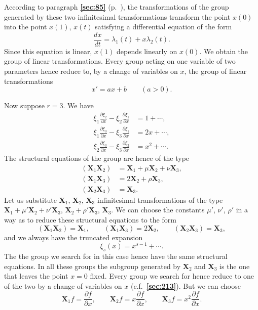 \documentclass[leqno,11pt]{book}
\numberwithin{equation}{chapter}
\newcommand{\pd}{\partial}
\theoremstyle{shape1}
\theoremstyle{shapesmall}
\newcommand{\fsref}[1]{{\rm\textsection\textbf{\ref{sec:#1}}}}
\begin{document}
According to paragraph \fsref{85} (p.~\pageref{sec:85}), the transformations of the group generated by these two infinitesimal transformations transform the point $x(0)$ into the point $x(1)$, $x(t)$ satisfying a differential equation of the form
\[
\frac{dx}{dt}=\lambda_{1}(t)+x\lambda_{2}(t).
\]
Since this equation is linear, $x(1)$ depends linearly on $x(0)$. We obtain the group of linear transformations. Every group acting on one variable of two parameters hence reduce to, by a change of variables on $x$, the group of linear transformations
\[
x'=ax+b\qquad(a>0).
\]

Now suppose $r=3$. We have
\begin{align*}
  \xi_{1}\frac{\pd \xi_{2}}{\pd x}-\xi_{2}\frac{\pd \xi_{1}}{\pd x}&=1+\cdots,\\
  \xi_{1}\frac{\pd \xi_{3}}{\pd x}-\xi_{3}\frac{\pd \xi_{1}}{\pd x}&=2x+\cdots,\\
  \xi_{2}\frac{\pd \xi_{3}}{\pd x}-\xi_{3}\frac{\pd \xi_{2}}{\pd x}&=x^{2}+\cdots.
\end{align*}
The structural equations of the group are hence of the type
\begin{align*}
  (\mathbf{X}_{1}\mathbf{X}_{2})&=\mathbf{X}_{1}+\mu\mathbf{X}_{2}+\nu\mathbf{X}_{3},\\
  (\mathbf{X}_{1}\mathbf{X}_{3})&=2\mathbf{X}_{2}+\rho\mathbf{X}_{3},\\
  (\mathbf{X}_{2}\mathbf{X}_{3})&=\mathbf{X}_{3}.
\end{align*}
Let us substitute $\mathbf{X}_{1}$, $\mathbf{X}_{2}$, $\mathbf{X}_{3}$ infinitesimal transformations of the type $\mathbf{X}_{1}+\mu'\mathbf{X}_{2}+\nu'\mathbf{X}_{3}$, $\mathbf{X}_{2}+\rho'\mathbf{X}_{3}$, $\mathbf{X}_{3}$. We can choose the constants $\mu'$, $\nu'$, $\rho'$ in a way as to reduce these structural equations to the form
\[
(\mathbf{X}_{1}\mathbf{X}_{2})=\mathbf{X}_{1},\qquad(\mathbf{X}_{1}\mathbf{X}_{3})=2\mathbf{X}_{2},\qquad (\mathbf{X}_{2}\mathbf{X}_{3})=\mathbf{X}_{3},
\]
and we always have the truncated expansion
\[
\xi_{s}(x)=x^{s-1}+\cdots.
\]
The the group we search for in this case hence have the same structural equations. In all these groups the subgroup generated by $\mathbf{X}_{2}$ and $\mathbf{X}_{3}$ is the one that leaves the point $x=0$ fixed. Every group we search for hence reduce to one of the two by a change of variables on $x$ (c.f.~\fsref{213}). But we can choose
\[
\mathbf{X}_{1}f=\frac{\pd f}{\pd x},\qquad\mathbf{X}_{2}f=x\frac{\pd f}{\pd x},\qquad\mathbf{X}_{3}f=x^{2}\frac{\pd f}{\pd x}.
\]
\end{document}
